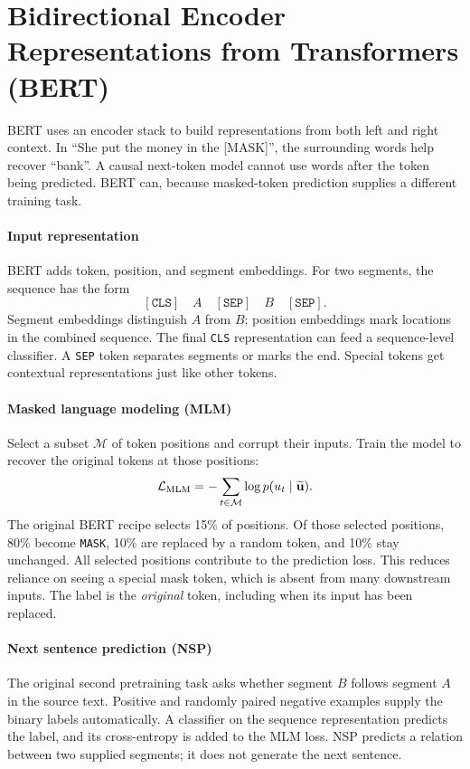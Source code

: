 \documentclass[11pt, oneside]{book}
\newcommand{\loss}{\mathcal{L}}          %
\newcommand{\params}{\boldsymbol{\theta}}   %
\let\originalsection\section
\renewcommand{\section}{\Needspace{7\baselineskip}\originalsection}
\begin{document}
\section{Bidirectional Encoder Representations from Transformers (BERT)}\label{sec:source-5-3}
BERT uses an encoder stack to build representations from both left and right context. In ``She put the money in the [MASK]'', the surrounding words help recover ``bank''. A causal next-token model cannot use words after the token being predicted. BERT can, because masked-token prediction supplies a different training task.

\paragraph{Input representation} BERT adds token, position, and segment embeddings. For two segments, the sequence has the form
\[
 [\texttt{CLS}]\quad A\quad[\texttt{SEP}]\quad B\quad[\texttt{SEP}].
\]
Segment embeddings distinguish $A$ from $B$; position embeddings mark locations in the combined sequence. The final \texttt{CLS} representation can feed a sequence-level classifier. A \texttt{SEP} token separates segments or marks the end. Special tokens get contextual representations just like other tokens.

\paragraph{Masked language modeling (MLM)} Select a subset $\mathcal{M}$ of token positions and corrupt their inputs. Train the model to recover the original tokens at those positions:
\[
 \loss_{\rm MLM}=-\sum_{t\in\mathcal{M}}\log p(u_t\mid\widetilde{\mathbf{u}}).
\]
The original BERT recipe selects 15\% of positions. Of those selected positions, 80\% become \texttt{MASK}, 10\% are replaced by a random token, and 10\% stay unchanged. All selected positions contribute to the prediction loss. This reduces reliance on seeing a special mask token, which is absent from many downstream inputs. The label is the \emph{original} token, including when its input has been replaced.

\paragraph{Next sentence prediction (NSP)} The original second pretraining task asks whether segment $B$ follows segment $A$ in the source text. Positive and randomly paired negative examples supply the binary labels automatically. A classifier on the sequence representation predicts the label, and its cross-entropy is added to the MLM loss. NSP predicts a relation between two supplied segments; it does not generate the next sentence.
\end{document}
